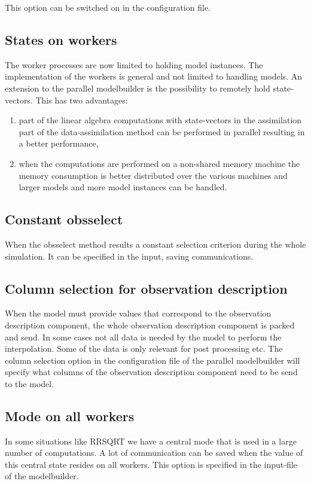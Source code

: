 This option can be switched on in the configuration file.

\subsection{States on workers}
The worker processes are now limited to holding model instances. The
implementation of the workers is general and not limited to handling
models. An extension to the parallel modelbuilder is the possibility to
remotely hold state-vectors.  This has two advantages:
\begin{enumerate}
\item part of the linear algebra computations with state-vectors in the
assimilation part of the data-assimilation method can be performed
in parallel resulting in a better performance,
\item when the computations are performed on a non-shared memory machine
the memory consumption is better distributed over the various machines and
larger models and more model instances can be handled. 
\end{enumerate}

\subsection{Constant obsselect}
When the obsselect method results a constant selection criterion during the
whole simulation. It can be specified in the input, saving communications.


\subsection{Column selection for observation description}
When the model must provide values that correspond to the observation
description component, the whole observation description component is
packed and send. In some cases not all data is needed by the model to
perform the interpolation. Some of the data is only relevant for post
processing etc. The column selection option in the configuration file of
the parallel modelbuilder will specify what columns of the observation
description component need to be send to the model.

\subsection{Mode on all workers}
In some situations like RRSQRT we have a central mode that is used in a
large number of computations. A lot of communication can be saved when the
value of this central state resides on all workers. This option is
specified in the input-file of the modelbuilder.

